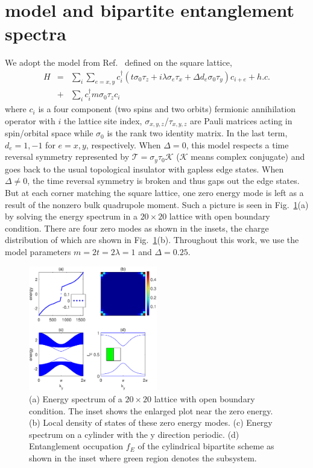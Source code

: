 \documentclass[twocolumn,superscriptaddress]{revtex4-1}
\begin{document}
\section{model and bipartite entanglement spectra}

We adopt the model from Ref.~ defined on the square lattice,
\begin{eqnarray} \label{eq:model}
  H &=& \sum_{i}\sum_{e=x,y} c_i^\dag\left( t\sigma_0\tau_z + i\lambda \sigma_e\tau_x + \Delta d_e \sigma_0\tau_y \right)c_{i+e} + h.c. \nonumber\\ 
    &+& \sum_i c_i^\dag m\sigma_0 \tau_z c_i
\end{eqnarray}
where $c_i$ is a four component (two spins and two orbits) fermionic annihilation operator with $i$ the lattice site index, $\sigma_{x,y,z}$/$\tau_{x,y,z}$ are Pauli matrices acting in spin/orbital space while $\sigma_0$ is the rank two identity matrix. In the last term, $d_e=1,-1$ for $e=x,y$, respectively. When $\Delta=0$, this model respects a time reversal symmetry represented by $\mathcal{T}=\sigma_y\tau_0\mathcal{K}$ ($\mathcal{K}$ means complex conjugate) and goes back to the usual topological insulator with gapless edge states. \cite{Qi_PRB_2008} When $\Delta\ne0$, the time reversal symmetry is broken and thus gaps out the edge states. But at each corner matching the square lattice, one zero energy mode is left as a result of the nonzero bulk quadrupole moment. \cite{Benalcazar_S_2017} Such a picture is seen in Fig.~\ref{fig:model}(a) by solving the energy spectrum in a $20\times20$ lattice with open boundary condition. There are four zero modes as shown in the insets, the charge distribution of which are shown in Fig.~\ref{fig:model}(b). Throughout this work, we use the model parameters $m=2t=2\lambda=1$ and $\Delta=0.25$. 

\begin{figure}
    \includegraphics[width=0.5\textwidth]{model.eps}
    \caption{\label{fig:model} (a) Energy spectrum of a $20\times20$ lattice with open boundary condition. The inset shows the enlarged plot near the zero energy. (b) Local density of states of these zero energy modes. (c) Energy spectrum on a cylinder with the y direction periodic. (d) Entanglement occupation $f_E$ of the cylindrical bipartite scheme as shown in the inset where green region denotes the subsystem. }
\end{figure}
\end{document}
